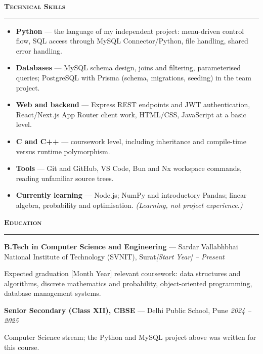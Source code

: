 \documentclass[10pt,a4paper]{article}
\newcommand{\cvsection}[1]{%
  \par\vspace{7pt}%
  {\fontsize{11}{13}\selectfont\bfseries\scshape\color{accent}#1\par}%
  \vspace{1.5pt}%
  {\color{rulegray}\rule{\textwidth}{0.55pt}\par}%
  \vspace{2.5pt}%
}
\newcommand{\meta}[1]{%
  \par{\color{black!65}#1}\par\vspace{1pt}}
\begin{document}
\cvsection{Technical Skills}
\begin{itemize}
  \item \textbf{Python} --- the language of my independent project: menu-driven control flow, SQL
        access through MySQL Connector/Python, file handling, shared error handling.
  \item \textbf{Databases} --- MySQL schema design, joins and filtering, parameterised queries;
        PostgreSQL with Prisma (schema, migrations, seeding) in the team project.
  \item \textbf{Web and backend} --- Express REST endpoints and JWT authentication, React/Next.js App
        Router client work, HTML/CSS, JavaScript at a basic level.
  \item \textbf{C and C++} --- coursework level, including inheritance and compile-time versus runtime
        polymorphism.
  \item \textbf{Tools} --- Git and GitHub, VS Code, Bun and Nx workspace commands, reading unfamiliar
        source trees.
  \item \textbf{Currently learning} --- Node.js; NumPy and introductory Pandas; linear algebra,
        probability and optimisation. \emph{(Learning, not project experience.)}
\end{itemize}

\cvsection{Education}
{\textbf{B.Tech in Computer Science and Engineering} --- Sardar Vallabhbhai National Institute of
 Technology (SVNIT), Surat}\hfill{\itshape\color{black!65}[Start Year] -- Present}\par
\meta{Expected graduation [Month Year] \;\textbullet\; relevant coursework: data structures and
      algorithms, discrete mathematics and probability, object-oriented programming, database
      management systems.}
\vspace{2pt}
{\textbf{Senior Secondary (Class XII), CBSE} --- Delhi Public School, Pune}\hfill
{\itshape\color{black!65}2024 -- 2025}\par
\meta{Computer Science stream; the Python and MySQL project above was written for this course.}
\end{document}
